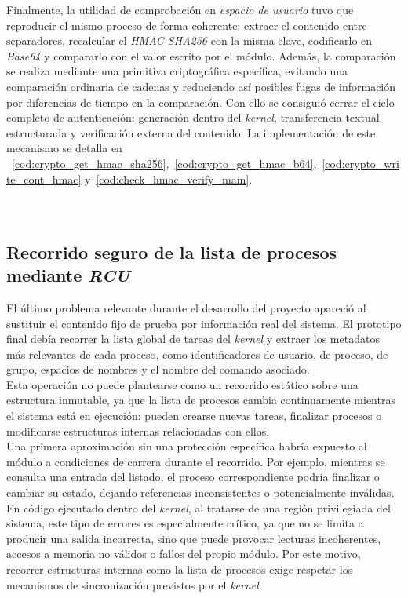 Finalmente, la utilidad de comprobación en \textit{espacio de usuario} tuvo que reproducir el mismo proceso de forma coherente: extraer el contenido entre separadores, recalcular el \textit{HMAC-SHA256} con la misma clave, codificarlo en \textit{Base64} y compararlo con el valor escrito por el módulo.
Además, la comparación se realiza mediante una primitiva criptográfica específica, evitando una comparación ordinaria de cadenas y reduciendo así posibles fugas de información por diferencias de tiempo en la comparación.
Con ello se consiguió cerrar el ciclo completo de autenticación: generación dentro del \textit{kernel}, transferencia textual estructurada y verificación externa del contenido.
La implementación de este mecanismo se detalla en ~\ref{cod:crypto_get_hmac_sha256},~\ref{cod:crypto_get_hmac_b64},~\ref{cod:crypto_write_cont_hmac} y~\ref{cod:check_hmac_verify_main}.\\\\

\

\subsection{Recorrido seguro de la lista de procesos mediante \textit{RCU}}

El último problema relevante durante el desarrollo del proyecto apareció al sustituir el contenido fijo de prueba por información real del sistema.
El prototipo final debía recorrer la lista global de tareas del \textit{kernel} y extraer los metadatos más relevantes de cada proceso, como identificadores de usuario, de proceso, de grupo, espacios de nombres y el nombre del comando asociado.\\

Esta operación no puede plantearse como un recorrido estático sobre una estructura inmutable, ya que la lista de procesos cambia continuamente mientras el sistema está en ejecución: pueden crearse nuevas tareas, finalizar procesos o modificarse estructuras internas relacionadas con ellos.\\

Una primera aproximación sin una protección específica habría expuesto al módulo a condiciones de carrera durante el recorrido.
Por ejemplo, mientras se consulta una entrada del listado, el proceso correspondiente podría finalizar o cambiar su estado, dejando referencias inconsistentes o potencialmente inválidas.\\

En código ejecutado dentro del \textit{kernel}, al tratarse de una región privilegiada del sistema, este tipo de errores es especialmente crítico, ya que no se limita a producir una salida incorrecta, sino que puede provocar lecturas incoherentes, accesos a memoria no válidos o fallos del propio módulo.
Por este motivo, recorrer estructuras internas como la lista de procesos exige respetar los mecanismos de sincronización previstos por el \textit{kernel}.\\

